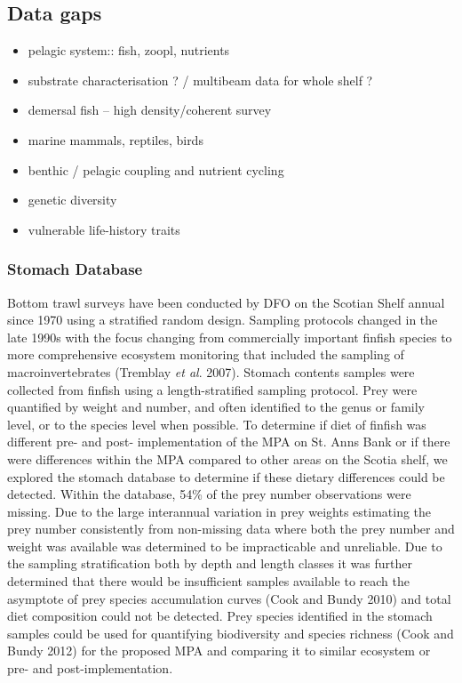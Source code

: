 \documentclass[letterpaper,portrait,11pt]{scrartcl}
\numberwithin{equation}{section}		%
\numberwithin{figure}{section}			%
\numberwithin{table}{section}				%
\begin{document}
\subsection{Data gaps}
\begin{itemize}
  \item pelagic system:: fish, zoopl, nutrients 
  \item substrate characterisation ?  / multibeam data for whole shelf ?
  \item demersal fish -- high density/coherent survey
  \item marine mammals, reptiles, birds
  \item benthic / pelagic coupling and nutrient cycling
  \item genetic diversity 
  \item vulnerable life-history traits
  
\end{itemize}	

\subsubsection{Stomach Database}
Bottom trawl surveys have been conducted by DFO on the Scotian Shelf annual since 1970 using a stratified random design.  Sampling protocols changed in the late 1990s with the focus changing from commercially important finfish species to more comprehensive ecosystem monitoring that included the sampling of macroinvertebrates (Tremblay \textit{et al}. 2007).  Stomach contents samples were collected from finfish using a length-stratified sampling protocol.  Prey were quantified by weight and number, and often identified to the genus or family level, or to the species level when possible.  To determine if diet of finfish was different pre- and post- implementation of the MPA on St. Anns Bank or if there were differences within the MPA compared to other areas on the Scotia shelf, we explored the stomach database to determine if these dietary differences could be detected. Within the database, 54\% of the prey number observations were missing.  Due to the large interannual variation in prey weights estimating the prey number consistently from non-missing data where both the prey number and weight was available was determined to be impracticable and unreliable.  Due to the sampling stratification both by depth and length classes it was further determined that there would be insufficient samples available to reach the asymptote of prey species accumulation curves (Cook and Bundy 2010) and total diet composition could not be detected.  Prey species identified in the stomach samples could be used for quantifying biodiversity and species richness (Cook and Bundy 2012) for the proposed MPA and comparing it to similar ecosystem or pre- and post-implementation.
\end{document}
